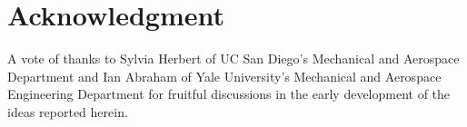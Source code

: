 \section{Acknowledgment}
A vote of thanks to Sylvia Herbert of UC San Diego's Mechanical and Aerospace Department and Ian Abraham of Yale University's Mechanical and Aerospace Engineering Department for fruitful discussions in the early development of the ideas reported herein.
